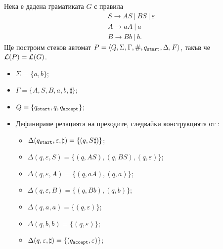 \begin{example}
  Нека е дадена граматиката $G$ с правила 
  \begin{align*}
    & S \to AS\ |\ BS\ |\ \varepsilon\\
    & A \to aA\ |\ a\\
    & B \to Bb\ |\ b.
  \end{align*}
  Ще построим стеков автомат $P = \langle{Q,\Sigma,\Gamma,\#,q_{\texttt{start}},\Delta,F}\rangle$, такъв че $\mathcal{L}(P) = \mathcal{L}(G)$.
  \begin{itemize}
  \item
    $\Sigma = \{a,b\}$;
  \item 
    $\Gamma = \{A,S,B,a,b,\sharp\}$;
  \item
    $Q = \{q_{\texttt{start}},q,q_{\texttt{accept}}\}$;
  \item
    Дефинираме релацията на преходите, следвайки конструкцията от :
    \begin{itemize}
    \item
      $\Delta(q_{\texttt{start}}, \varepsilon, \sharp) = \{(q, S\sharp)\}$;
    \item 
      $\Delta(q, \varepsilon, S) = \{(q, AS), (q, BS), (q, \varepsilon)\}$;
    \item
      $\Delta(q, \varepsilon, A) = \{(q, aA), (q, a)\}$;
    \item
      $\Delta(q, \varepsilon, B) = \{(q, Bb), (q, b)\}$;
    \item
      $\Delta(q, a, a) = \{(q, \varepsilon)\}$;
    \item
      $\Delta(q, b, b) = \{(q, \varepsilon)\}$;
    \item
      $\Delta(q, \varepsilon, \sharp) = \{(q_{\texttt{accept}},\varepsilon)\}$;
    \end{itemize}
  \end{itemize}
\end{example}

